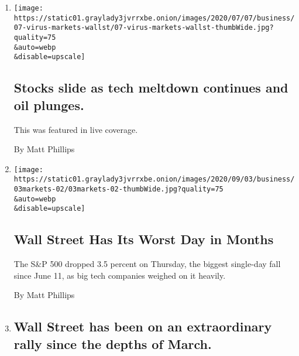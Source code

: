 \begin{enumerate}
\def\labelenumi{\arabic{enumi}.}
\item
  \href{/live/2020/09/08/business/stock-market-today-coronavirus/stocks-slide-as-tech-meltdown-continues-and-oil-plunges}{}

  \texttt{[image: https://static01.graylady3jvrrxbe.onion/images/2020/07/07/business/07-virus-markets-wallst/07-virus-markets-wallst-thumbWide.jpg?quality=75\\\&auto=webp\\\&disable=upscale]}

  \hypertarget{stocks-slide-as-tech-meltdown-continues-and-oil-plunges}{%
  \subsection{Stocks slide as tech meltdown continues and oil
  plunges.}\label{stocks-slide-as-tech-meltdown-continues-and-oil-plunges}}

  This was featured in live coverage.

  By Matt Phillips
\item
  \href{/2020/09/03/business/stock-market-shares-covid.html}{}

  \texttt{[image: https://static01.graylady3jvrrxbe.onion/images/2020/09/03/business/03markets-02/03markets-02-thumbWide.jpg?quality=75\\\&auto=webp\\\&disable=upscale]}

  \hypertarget{wall-street-has-its-worst-day-in-months}{%
  \subsection{Wall Street Has Its Worst Day in
  Months}\label{wall-street-has-its-worst-day-in-months}}

  The S\&P 500 dropped 3.5 percent on Thursday, the biggest single-day
  fall since June 11, as big tech companies weighed on it heavily.

  By Matt Phillips
\item
  \href{/live/2020/09/03/business/stock-market-today-coronavirus/wall-street-has-been-on-an-extraordinary-rally-since-the-depths-of-march}{}

  \hypertarget{wall-street-has-been-on-an-extraordinary-rally-since-the-depths-of-march}{%
  \subsection{Wall Street has been on an extraordinary rally since the
  depths of
  March.}\label{wall-street-has-been-on-an-extraordinary-rally-since-the-depths-of-march}}


\end{enumerate}
